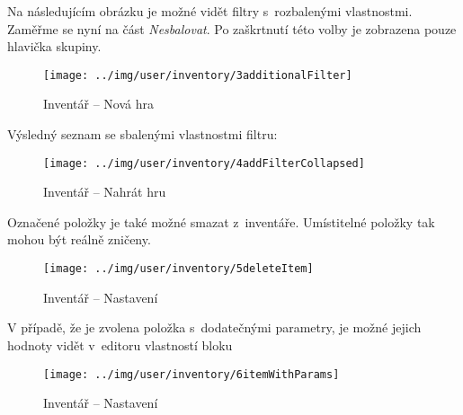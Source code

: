 \FloatBarrier

Na následujícím obrázku je možné vidět filtry s~rozbalenými vlastnostmi. Zaměřme se nyní na část \textit{Nesbalovat}. Po zaškrtnutí této volby je zobrazena pouze hlavička skupiny.

\begin{figure}[!ht]\centering
\texttt{[image: ../img/user/inventory/3additionalFilter]}

\caption{Inventář -- Nová hra}
\label{fig:user_inventory_3additionalFilter}

\end{figure}

\FloatBarrier

Výsledný seznam se sbalenými vlastnostmi filtru:

\begin{figure}[!ht]\centering
\texttt{[image: ../img/user/inventory/4addFilterCollapsed]}

\caption{Inventář -- Nahrát hru}
\label{fig:user_inventory_4addFilterCollapsed}

\end{figure}

\FloatBarrier

Označené položky je také možné smazat z~inventáře. Umístitelné položky tak mohou být reálně zničeny. 

\begin{figure}[!ht]\centering
\texttt{[image: ../img/user/inventory/5deleteItem]}

\caption{Inventář -- Nastavení}
\label{fig:user_inventory_5deleteItem}

\end{figure}

\FloatBarrier
V případě, že je zvolena položka s~dodatečnými parametry, je možné jejich hodnoty vidět v~editoru vlastností bloku

\begin{figure}[!ht]\centering
\texttt{[image: ../img/user/inventory/6itemWithParams]}

\caption{Inventář -- Nastavení}
\label{fig:user_inventory_6itemWithParams}

\end{figure}


\FloatBarrier